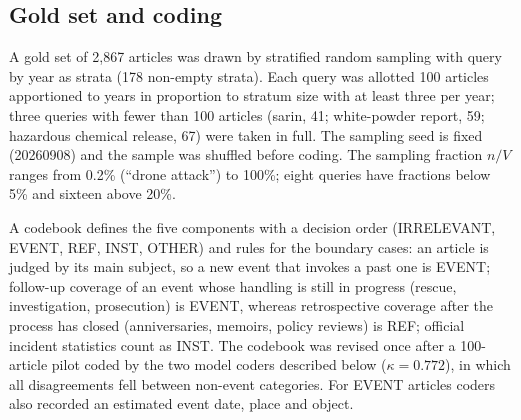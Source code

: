 \documentclass[1p,times]{elsarticle}
\begin{document}
\subsection{Gold set and coding}
\label{sec:coding}
A gold set of 2,867 articles was drawn by stratified random sampling with query by year as strata (178 non-empty strata). Each query was allotted 100 articles apportioned to years in proportion to stratum size with at least three per year; three queries with fewer than 100 articles (sarin, 41; white-powder report, 59; hazardous chemical release, 67) were taken in full. The sampling seed is fixed (20260908) and the sample was shuffled before coding. The sampling fraction $n/V$ ranges from 0.2\% (``drone attack'') to 100\%; eight queries have fractions below 5\% and sixteen above 20\%.

A codebook defines the five components with a decision order (IRRELEVANT, EVENT, REF, INST, OTHER) and rules for the boundary cases: an article is judged by its main subject, so a new event that invokes a past one is EVENT; follow-up coverage of an event whose handling is still in progress (rescue, investigation, prosecution) is EVENT, whereas retrospective coverage after the process has closed (anniversaries, memoirs, policy reviews) is REF; official incident statistics count as INST. The codebook was revised once after a 100-article pilot coded by the two model coders described below ($\kappa = 0.772$), in which all disagreements fell between non-event categories. For EVENT articles coders also recorded an estimated event date, place and object.
\end{document}
